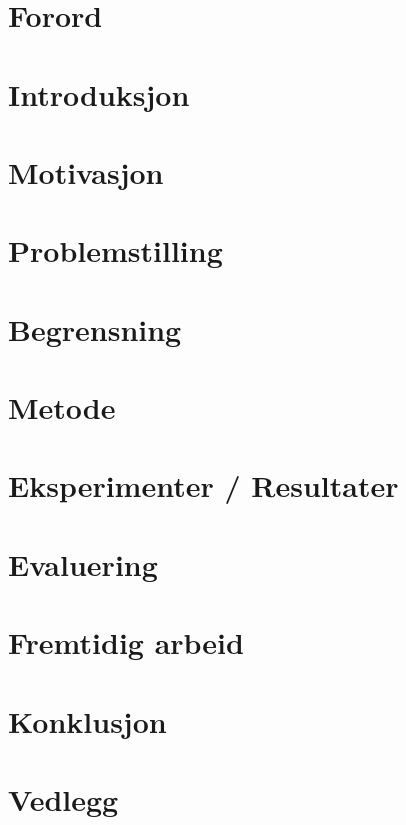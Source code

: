 \documentclass[12pt,twoside,norsk,onecolumn]{article}
\begin{document}
\newcommand{\bht}{Bård Henning Tvedt }
\newcommand{\bhtmb}{Bård Henning Tvedt og Marc Bezem }
\newcommand{\ilog}{ILOG Scheduler }

\tableofcontents
\newpage

\section*{Forord}
%
\newpage

\begin{center}
\printnomenclature[2.5 cm]
\end{center}
\newpage

\section{Introduksjon}



\section{Motivasjon}


\section{Problemstilling}


\section{Begrensning}


\section{Metode}


\section{Eksperimenter / Resultater}


\section{Evaluering}


\section{Fremtidig arbeid}


\section{Konklusjon}

\newpage

\section{Vedlegg}

\newpage




\end{document}
